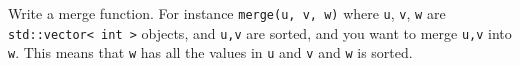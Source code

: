   Write a merge function.
  For instance \verb!merge(u, v, w)! where
  \verb!u!, \verb!v!, \verb!w! are \verb!std::vector< int >!
  objects, and \verb!u,v! are sorted, and you want to merge \verb!u,v! into \verb!w!. This means that \verb!w! has all the values in \verb!u! and \verb!v!
  and \verb!w! is sorted.
